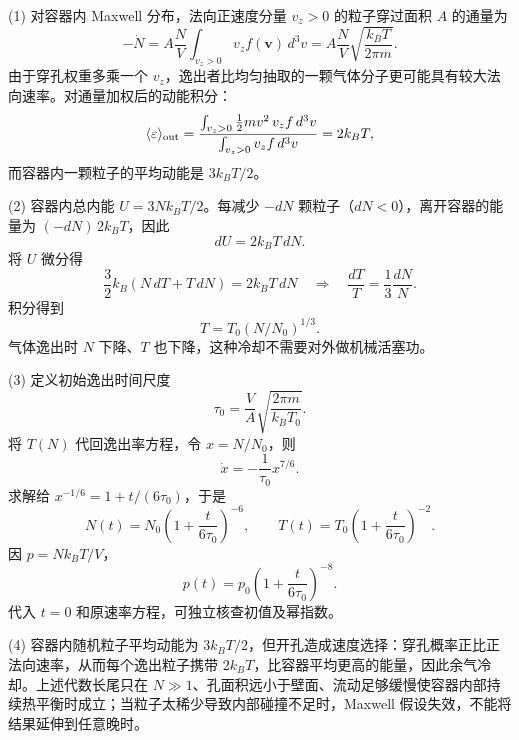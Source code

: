 (1) 对容器内 Maxwell 分布，法向正速度分量 \(v_z>0\) 的粒子穿过面积 \(A\) 的通量为
\[
-\dot N=A\frac NV\int_{v_z>0}v_z f(\boldsymbol v)\,d^3v
=A\frac NV\sqrt{\frac{k_BT}{2\pi m}}.
\]
由于穿孔权重多乘一个 \(v_z\)，逸出者比均匀抽取的一颗气体分子更可能具有较大法向速率。对通量加权后的动能积分：
\[
\langle\varepsilon\rangle_{\rm out}
=\frac{\int_{v_z>0}\frac12mv^2\,v_z f\,d^3v}
{\int_{v_z>0}v_z f\,d^3v}
=2k_BT,
\]
而容器内一颗粒子的平均动能是 \(3k_BT/2\)。

(2) 容器内总内能 \(U=3Nk_BT/2\)。每减少 \(-dN\) 颗粒子（\(dN<0\)），离开容器的能量为 \((-dN)\,2k_BT\)，因此
\[
dU=2k_BT\,dN.
\]
将 \(U\) 微分得
\[
\frac32k_B(N\,dT+T\,dN)=2k_BT\,dN
\quad\Longrightarrow\quad \frac{dT}{T}=\frac13\frac{dN}{N}.
\]
积分得到
\[
T=T_0(N/N_0)^{1/3}.
\]
气体逸出时 \(N\) 下降、\(T\) 也下降，这种冷却不需要对外做机械活塞功。

(3) 定义初始逸出时间尺度
\[
\tau_0=\frac{V}{A}\sqrt{\frac{2\pi m}{k_BT_0}}.
\]
将 \(T(N)\) 代回逸出率方程，令 \(x=N/N_0\)，则
\[
\dot x=-\frac1{\tau_0}x^{7/6}.
\]
求解给 \(x^{-1/6}=1+t/(6\tau_0)\)，于是
\[
N(t)=N_0\left(1+\frac{t}{6\tau_0}\right)^{-6},\qquad
T(t)=T_0\left(1+\frac{t}{6\tau_0}\right)^{-2}.
\]
因 \(p=Nk_BT/V\)，
\[
p(t)=p_0\left(1+\frac{t}{6\tau_0}\right)^{-8}.
\]
代入 \(t=0\) 和原速率方程，可独立核查初值及幂指数。

(4) 容器内随机粒子平均动能为 \(3k_BT/2\)，但开孔造成速度选择：穿孔概率正比正法向速率，从而每个逸出粒子携带 \(2k_BT\)，比容器平均更高的能量，因此余气冷却。上述代数长尾只在 \(N\gg1\)、孔面积远小于壁面、流动足够缓慢使容器内部持续热平衡时成立；当粒子太稀少导致内部碰撞不足时，Maxwell 假设失效，不能将结果延伸到任意晚时。
